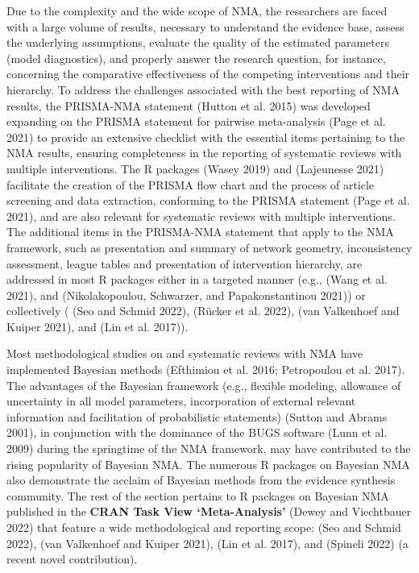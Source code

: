 Due to the complexity and the wide scope of NMA, the researchers are faced with
a large volume of results, necessary to understand the evidence base, assess the
underlying assumptions, evaluate the quality of the estimated parameters (model
diagnostics), and properly answer the research question, for instance, concerning
the comparative effectiveness of the competing interventions and their hierarchy.
To address the challenges associated with the best reporting of NMA results, the
PRISMA-NMA statement (Hutton et al. 2015) was developed expanding on the PRISMA statement
for pairwise meta-analysis (Page et al. 2021) to provide an extensive checklist with the
essential items pertaining to the NMA results, ensuring completeness in the reporting
of systematic reviews with multiple interventions. The R packages
 (Wasey 2019) and  (Lajeunesse 2021)
facilitate the creation of the PRISMA flow chart and the process of article screening
and data extraction, conforming to the PRISMA statement (Page et al. 2021), and are also
relevant for systematic reviews with multiple interventions. The additional items
in the PRISMA-NMA statement that apply to the NMA framework, such as presentation
and summary of network geometry, inconsistency assessment, league tables and
presentation of intervention hierarchy, are addressed in most R packages either
in a targeted manner (e.g.,  (Wang et al. 2021), and
 (Nikolakopoulou, Schwarzer, and Papakonstantinou 2021)) or collectively ( (Seo and Schmid 2022),
 (Rücker et al. 2022),  (van Valkenhoef and Kuiper 2021), and 
(Lin et al. 2017)).

Most methodological studies on and systematic reviews with NMA have implemented
Bayesian methods (Efthimiou et al. 2016; Petropoulou et al. 2017). The advantages of the Bayesian
framework (e.g., flexible modeling, allowance of uncertainty in all model parameters,
incorporation of external relevant information and facilitation of probabilistic
statements) (Sutton and Abrams 2001), in conjunction with the dominance of the BUGS software
(Lunn et al. 2009) during the springtime of the NMA framework, may have contributed to
the rising popularity of Bayesian NMA. The numerous R packages on Bayesian NMA
also demonstrate the acclaim of Bayesian methods from the evidence synthesis
community. The rest of the section pertains to R packages on Bayesian NMA published
in the \textbf{CRAN Task View `Meta-Analysis'} (Dewey and Viechtbauer 2022) that feature a wide
methodological and reporting scope:  (Seo and Schmid 2022),  (van Valkenhoef and Kuiper 2021),
 (Lin et al. 2017), and  (Spineli 2022) (a recent novel
contribution).

